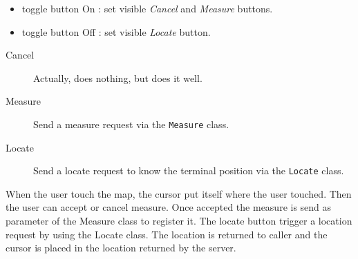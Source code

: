 \begin{itemize}
    \item toggle button On : set visible \textit{Cancel} and \textit{Measure}
        buttons.
    \item toggle button Off : set visible \textit{Locate} button.
\end{itemize}

\begin{description}
    \item[Cancel] Actually, does nothing, but does it well.
    \item[Measure] Send a measure request via the \verb+Measure+ class.
    \item[Locate] Send a locate request to know the terminal position via the
        \verb+Locate+ class.
\end{description}

When the user touch the map, the cursor put itself where the user touched.
Then the user can accept or cancel measure.
Once accepted the measure is send as parameter of the Measure class to register it.
The locate button trigger a location request by using the Locate class. The location is returned to caller and the cursor is placed in the location returned by the server.








